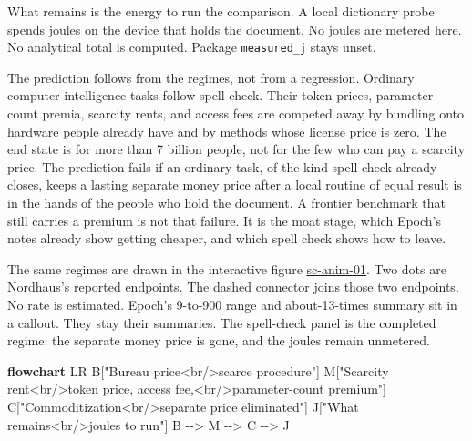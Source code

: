 \documentclass[
  10pt,
]{article}
\newenvironment{Shaded}{}{}
\newcommand{\ConstantTok}[1]{\textcolor[rgb]{0.53,0.00,0.00}{#1}}
\newcommand{\DataTypeTok}[1]{\textcolor[rgb]{0.56,0.13,0.00}{#1}}
\newcommand{\KeywordTok}[1]{\textcolor[rgb]{0.00,0.44,0.13}{\textbf{#1}}}
\newcommand{\NormalTok}[1]{#1}
\newcommand{\PreprocessorTok}[1]{\textcolor[rgb]{0.74,0.48,0.00}{#1}}
\newcommand{\SpecialCharTok}[1]{\textcolor[rgb]{0.25,0.44,0.63}{#1}}
\newcommand{\StringTok}[1]{\textcolor[rgb]{0.25,0.44,0.63}{#1}}
\begin{document}
What remains is the energy to run the comparison. A local dictionary
probe spends joules on the device that holds the document. No joules are
metered here. No analytical total is computed. Package
\texttt{measured\_j} stays unset.

The prediction follows from the regimes, not from a regression. Ordinary
computer-intelligence tasks follow spell check. Their token prices,
parameter-count premia, scarcity rents, and access fees are competed
away by bundling onto hardware people already have and by methods whose
license price is zero. The end state is for more than 7 billion people,
not for the few who can pay a scarcity price. The prediction fails if an
ordinary task, of the kind spell check already closes, keeps a lasting
separate money price after a local routine of equal result is in the
hands of the people who hold the document. A frontier benchmark that
still carries a premium is not that failure. It is the moat stage, which
Epoch's notes already show getting cheaper, and which spell check shows
how to leave.

The same regimes are drawn in the interactive figure
\href{https://research.openie.dev/living/spellcheck/\#sc-anim-01}{sc-anim-01}.
Two dots are Nordhaus's reported endpoints. The dashed connector joins
those two endpoints. No rate is estimated. Epoch's 9-to-900 range and
about-13-times summary sit in a callout. They stay their summaries. The
spell-check panel is the completed regime: the separate money price is
gone, and the joules remain unmetered.

\begin{Shaded}
\begin{Highlighting}[]
\KeywordTok{flowchart} \ConstantTok{LR}
  \DataTypeTok{B}\NormalTok{[}\StringTok{"Bureau price}\SpecialCharTok{\textless{}br/\textgreater{}}\StringTok{scarce procedure"}\NormalTok{]}
  \DataTypeTok{M}\NormalTok{[}\StringTok{"Scarcity rent}\SpecialCharTok{\textless{}br/\textgreater{}}\StringTok{token price, access fee,}\SpecialCharTok{\textless{}br/\textgreater{}}\StringTok{parameter{-}count premium"}\NormalTok{]}
  \DataTypeTok{C}\NormalTok{[}\StringTok{"Commoditization}\SpecialCharTok{\textless{}br/\textgreater{}}\StringTok{separate price eliminated"}\NormalTok{]}
  \DataTypeTok{J}\NormalTok{[}\StringTok{"What remains}\SpecialCharTok{\textless{}br/\textgreater{}}\StringTok{joules to run"}\NormalTok{]}
  \DataTypeTok{B} \PreprocessorTok{{-}{-}\textgreater{}} \DataTypeTok{M} \PreprocessorTok{{-}{-}\textgreater{}} \DataTypeTok{C} \PreprocessorTok{{-}{-}\textgreater{}} \DataTypeTok{J}
\end{Highlighting}
\end{Shaded}
\end{document}
